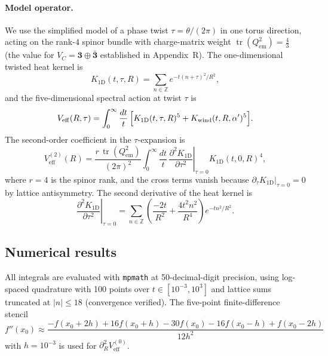 \paragraph{Model operator.}
We use the simplified model of a phase twist $\tau=\theta/(2\pi)$ in
one torus direction, acting on the rank-$4$ spinor bundle with
charge-matrix weight $\operatorname{tr}(Q_{\mathrm{em}}^2)=\tfrac{4}{3}$
(the value for $V_C=\mathbf{3}\oplus\bar{\mathbf{3}}$ established in
Appendix~R).  The one-dimensional twisted heat kernel is
\[
  K_{1\mathrm{D}}(t,\tau,R)
    = \sum_{n\in\mathbb{Z}} e^{-t(n+\tau)^2/R^2},
\]
and the five-dimensional spectral action at twist $\tau$ is
\begin{equation}
  V_{\mathrm{eff}}(R,\tau)
    = \int_0^\infty \frac{dt}{t}\,
      \Bigl[K_{1\mathrm{D}}(t,\tau,R)^5
           + K_{\mathrm{wind}}(t,R,\alpha')^5\Bigr].
\end{equation}
The second-order coefficient in the $\tau$-expansion is
\begin{equation}
  \label{eq:Veff2def}
  V_{\mathrm{eff}}^{(2)}(R)
    = \frac{r\,\operatorname{tr}(Q_{\mathrm{em}}^2)}{(2\pi)^2}
      \int_0^\infty \frac{dt}{t}\,
      \left.\frac{\partial^2 K_{1\mathrm{D}}}{\partial\tau^2}
      \right|_{\tau=0}
      K_{1\mathrm{D}}(t,0,R)^4,
\end{equation}
where $r=4$ is the spinor rank, and the cross terms vanish because
$\partial_\tau K_{1\mathrm{D}}|_{\tau=0}=0$ by lattice antisymmetry.
The second derivative of the heat kernel is
\begin{equation}
  \left.\frac{\partial^2 K_{1\mathrm{D}}}{\partial\tau^2}
  \right|_{\tau=0}
    = \sum_{n\in\mathbb{Z}}
      \left(\frac{-2t}{R^2}+\frac{4t^2 n^2}{R^4}\right)
      e^{-tn^2/R^2}.
\end{equation}

\subsection{Numerical results}
\label{ssec:B1results}

All integrals are evaluated with \texttt{mpmath} at 50-decimal-digit
precision, using log-spaced quadrature with 100 points over
$t\in[10^{-3},10^3]$ and lattice sums truncated at $|n|\leq 18$
(convergence verified).  The five-point finite-difference stencil
\[
  f''(x_0)
    \approx \frac{-f(x_0+2h)+16f(x_0+h)-30f(x_0)-16f(x_0-h)+f(x_0-2h)}{12h^2}
\]
with $h=10^{-3}$ is used for $\partial_R^2 V_{\mathrm{eff}}^{(0)}$.

